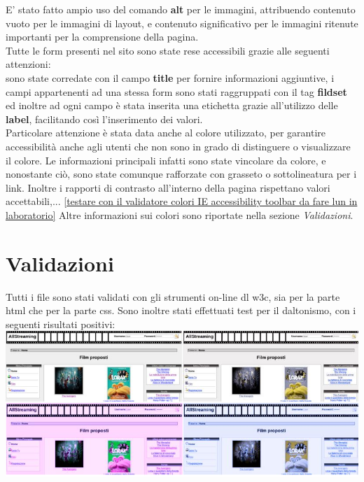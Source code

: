 E' stato fatto ampio uso del comando \textbf{alt} per le immagini, attribuendo contenuto vuoto per le immagini di layout, e contenuto significativo per le immagini ritenute importanti per la comprensione della pagina.\\

Tutte le form presenti nel sito sono state rese accessibili grazie alle seguenti attenzioni:\\
sono state corredate con il campo \textbf{title} per fornire informazioni aggiuntive, i campi appartenenti ad una stessa form sono stati raggruppati con il tag \textbf{fildset} ed inoltre ad ogni campo è stata inserita una etichetta grazie all'utilizzo delle \textbf{label}, facilitando così l'inserimento dei valori.\\

Particolare attenzione è stata data anche al colore utilizzato, per garantire accessibilità anche agli utenti che non sono in grado di distinguere o visualizzare il colore. Le informazioni principali infatti sono state vincolare da colore, e nonostante ciò, sono state comunque rafforzate con grasseto o sottolineatura per i link.
Inoltre i rapporti di contrasto all'interno della pagina rispettano valori accettabili,... 
\ref{testare con il validatore colori IE accessibility toolbar da fare lun in laboratorio}
Altre informazioni sui colori sono riportate nella sezione \textit{Validazioni}.



\section{Validazioni}
Tutti i file sono stati validati con gli strumenti on-line dl w3c, sia per la parte html che per la parte css.
Sono inoltre stati effettuati test per il daltonismo, con i seguenti risultati positivi: 
\includegraphics[scale=0.55]{images/test}






